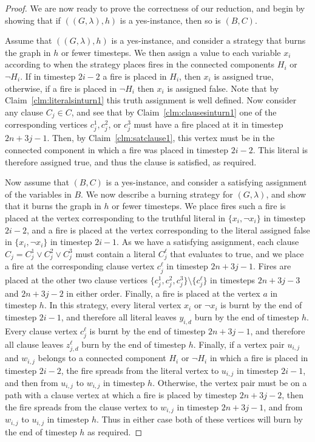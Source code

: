\documentclass[preprint,12pt]{elsarticle}
\begin{document}
\begin{proof}
    We are now ready to prove the correctness of our reduction, and begin by showing that if $((G, \lambda), h)$ is a yes-instance, then so is $(B,C)$.
    
    Assume that $((G, \lambda), h)$ is a yes-instance, and consider a strategy that burns the graph in $h$ or fewer timesteps. We then assign a value to each variable $x_i$ according to when the strategy places fires in the connected components $H_i$ or $\lnot H_i$. If in timestep $2i-2$ a fire is placed in $H_i$, then $x_i$ is assigned true, otherwise, if a fire is placed in $\lnot H_i$ then $x_i$ is assigned false. Note that by Claim~\ref{clm:literalsinturn1} this truth assignment is well defined. Now consider any clause $C_j \in C$, and see that by Claim~\ref{clm:clausesinturn1} one of the corresponding vertices $c_j^1, c_j^2$, or $c_j^3$ must have a fire placed at it in timestep $2n+3j-1$. Then, by Claim~\ref{clm:satclause1}, this vertex must be in the connected component in which a fire was placed in timestep $2i-2$. This literal is therefore assigned true, and thus the clause is satisfied, as required.
    
    Now assume that $(B, C)$ is a yes-instance, and consider a satisfying assignment of the variables in $B$. We now describe a burning strategy for $(G, \lambda)$, and show that it burns the graph in $h$ or fewer timesteps. We place fires such a fire is placed at the vertex corresponding to the truthful literal in $\{x_i,\lnot x_i\}$ in timestep $2i-2$, and a fire is placed at the vertex corresponding to the literal assigned false in $\{x_i,\lnot x_i\}$ in timestep $2i-1$. As we have a satisfying assignment, each clause $C_j = C_j^1 \lor C_j^2 \lor C_j^3$ must contain a literal $C_j^\ell$ that evaluates to true, and we place a fire at the corresponding clause vertex $c_j^\ell$ in timestep $2n+3j-1$. Fires are placed at the other two clause vertices $\{ c_j^1, c_j^2, c_j^3 \} \setminus \{ c_j^\ell \}$ in timesteps $2n+3j-3$ and $2n+3j-2$ in either order. Finally, a fire is placed at the vertex $a$ in timestep $h$. In this strategy, every literal vertex $x_i$ or $\lnot x_i$ is burnt by the end of timestep $2i-1$, and therefore all literal leaves $y_{i,d}$ burn by the end of timestep $h$. Every clause vertex $c_j^\ell$ is burnt by the end of timestep $2n+3j-1$, and therefore all clause leaves $z_{j,d}^\ell$ burn by the end of timestep $h$. Finally, if a vertex pair $u_{i,j}$ and $w_{i,j}$ belongs to a connected component $H_i$ or $\lnot H_i$ in which a fire is placed in timestep $2i-2$, the fire spreads from the literal vertex to $u_{i,j}$ in timestep $2i-1$, and then from $u_{i,j}$ to $w_{i,j}$ in timestep $h$. Otherwise, the vertex pair must be on a path with a clause vertex at which a fire is placed by timestep $2n+3j-2$, then the fire spreads from the clause vertex to $w_{i,j}$ in timestep $2n+3j-1$, and from $w_{i,j}$ to $u_{i,j}$ in timestep $h$. Thus in either case both of these vertices will burn by the end of timestep $h$ as required.
\end{proof}
\end{document}
